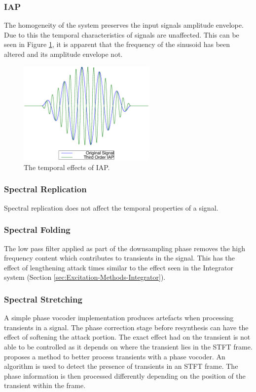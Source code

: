 		\subsubsection*{IAP}
			The homogeneity of the system preserves the input signals amplitude envelope. Due to this the
			temporal characteristics of signals are unaffected. This can be seen in Figure
			\ref{fig:IAPTemporalEffects}, it is apparent that the frequency of the sinusoid has been altered
			and its amplitude envelope not.

			\begin{figure}[h!]
				\centering
				\includegraphics[width=0.6\textwidth]{chapter5/Images/IAPTemporalEffects.eps}
				\caption{The temporal effects of IAP.}
				\label{fig:IAPTemporalEffects}
			\end{figure}
			
		\subsubsection*{Spectral Replication}
			Spectral replication does not affect the temporal properties of a signal.

		\subsubsection*{Spectral Folding}
			The low pass filter applied as part of the downsampling phase removes the high frequency content
			which contributes to transients in the signal. This has the effect of lengthening attack times
			similar to the effect seen in the Integrator system (Section
			\ref{sec:Excitation-Methods-Integrator}).

		\subsubsection*{Spectral Stretching}
			A simple phase vocoder implementation produces artefacts when processing transients in a signal.
			The phase correction stage before resynthesis can have the effect of softening the attack portion.
			The exact effect had on the transient is not able to be controlled as it depends on where the
			transient lies in the STFT frame. \citet{robel2003a} proposes a method to better process transients
			with a phase vocoder. An algorithm is used to detect the presence of transients in an STFT frame.
			The phase information is then processed differently depending on the position of the transient
			within the frame.

